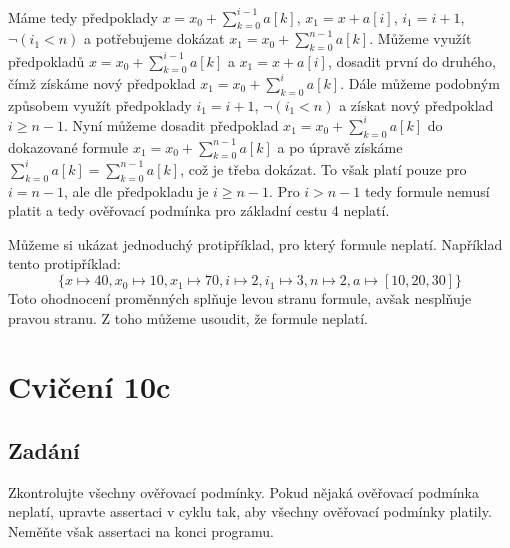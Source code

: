 \documentclass{article}
\begin{document}
Máme tedy předpoklady $x = x_0 + \sum_{k=0}^{i-1} a[k]$, $x_1 = x + a[i]$, $i_1 =  i + 1$, $\neg (i_1 < n)$ a potřebujeme dokázat $x_1 = x_0 + \sum_{k=0}^{n - 1} a[k]$. Můžeme využít předpokladů $x = x_0 + \sum_{k=0}^{i-1} a[k]$ a $x_1 = x + a[i]$, dosadit první do druhého, čímž získáme nový předpoklad $x_1 = x_0 + \sum_{k=0}^{i} a[k]$. Dále můžeme podobným způsobem využít předpoklady $i_1 = i + 1$, $\neg(i_1 < n)$ a získat nový předpoklad $i \geq n - 1$. Nyní můžeme dosadit předpoklad $x_1 = x_0 + \sum_{k=0}^{i} a[k]$ do dokazované formule $x_1 = x_0 + \sum_{k=0}^{n - 1} a[k]$ a po úpravě získáme $\sum_{k=0}^{i} a[k] = \sum_{k=0}^{n - 1} a[k]$, což je třeba dokázat. To však platí pouze pro $i = n - 1$, ale dle předpokladu je $i \geq n - 1$. Pro $i > n - 1$ tedy formule nemusí platit a tedy ověřovací podmínka pro základní cestu 4 neplatí.

Můžeme si ukázat jednoduchý protipříklad, pro který formule neplatí. Například tento protipříklad:
$$\{x \mapsto 40, x_0 \mapsto 10, x_1 \mapsto 70, i \mapsto 2, i_1 \mapsto 3, n \mapsto 2, a \mapsto [10,20,30]\}$$ Toto ohodnocení proměnných splňuje levou stranu formule, avšak nesplňuje pravou stranu. Z toho můžeme usoudit, že formule neplatí.
\newline\newline 

\section{Cvičení 10c}

\subsection{Zadání}
Zkontrolujte všechny ověřovací podmínky. Pokud nějaká ověřovací podmínka neplatí, upravte assertaci v cyklu tak, aby všechny ověřovací podmínky platily. Neměňte však assertaci na konci programu. 
\end{document}
